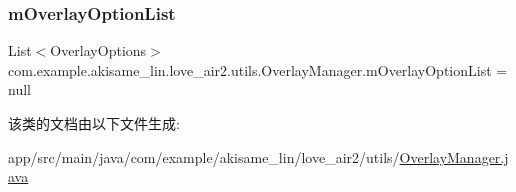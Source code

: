 \subsubsection{\texorpdfstring{mOverlayOptionList}{mOverlayOptionList}}
{\footnotesize\ttfamily List$<$Overlay\+Options$>$ com.\+example.\+akisame\+\_\+lin.\+love\+\_\+air2.\+utils.\+Overlay\+Manager.\+m\+Overlay\+Option\+List = null\hspace{0.3cm}{\ttfamily [private]}}



该类的文档由以下文件生成\+:\begin{DoxyCompactItemize}
\item 
app/src/main/java/com/example/akisame\+\_\+lin/love\+\_\+air2/utils/\mbox{\hyperlink{_overlay_manager_8java}{Overlay\+Manager.\+java}}\end{DoxyCompactItemize}
